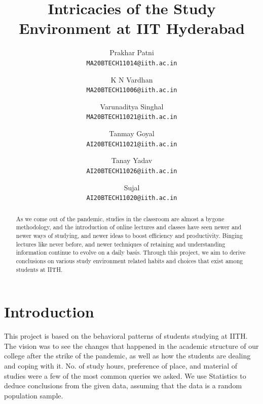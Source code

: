 \documentclass[12pt,onecolumn,letterpaper]{article}
\begin{document}
\title{ Intricacies of the Study Environment at IIT Hyderabad}

\author{Prakhar Patni\\
{\tt\small MA20BTECH11014@iith.ac.in}
\and
K N Vardhan\\
{\tt\small MA20BTECH11006@iith.ac.in}
\and
Varunaditya Singhal\\
{\tt\small MA20BTECH11021@iith.ac.in}
\and
Tanmay Goyal\\
{\tt\small AI20BTECH11021@iith.ac.in}
\and
Tanay Yadav\\
{\tt\small AI20BTECH11026@iith.ac.in}
\and
Sujal\\
{\tt\small AI20BTECH11020@iith.ac.in}
\and
}
\maketitle

\begin{abstract}
\hspace{0.3in} As we come out of the pandemic, studies in the classroom are almost a bygone methodology, and the introduction of online lectures and classes have seen newer and newer ways of studying, and newer ideas to boost efficiency and productivity. Binging lectures like never before, and newer techniques of retaining and understanding information continue to evolve on a daily basis. Through this project, we aim to derive conclusions on various study environment related habits and choices that exist among students at IITH.
\end{abstract}

\section {\Large{Introduction}}
\hspace{0.3in} This project is based on the behavioral patterns of students studying at IITH. The vision was to see the changes that happened in the academic structure of our college after the strike of the pandemic, as well as how the students are dealing and coping with it. No. of study hours, preference of place, and material of studies were a few of the most common queries we asked. We use Statistics to deduce conclusions from the given data, assuming that the data is a random population sample.\\
\end{document}

